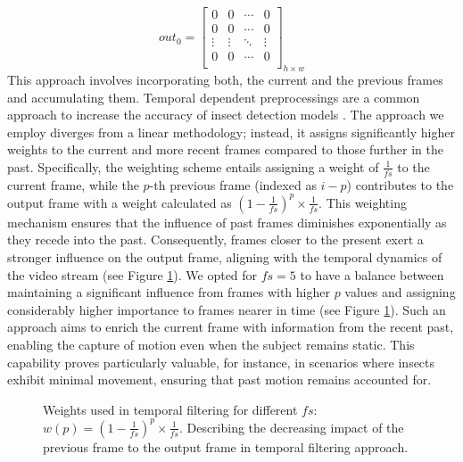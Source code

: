 \documentclass[sigchi,screen]{acmart}
\begin{document}
\[
out_0 = \begin{bmatrix}
0 & 0 & \cdots & 0 \\
0 & 0 & \cdots & 0 \\
\vdots & \vdots & \ddots & \vdots \\
0 & 0 & \cdots & 0 \\
\end{bmatrix}_{h \times w}
\]
This approach involves incorporating both, the current and the previous frames and accumulating them. Temporal dependent preprocessings are a common approach to increase the accuracy of insect detection models \cite{thiele2021towards}. The approach we employ diverges from a linear methodology; instead, it assigns significantly higher weights to the current and more recent frames compared to those further in the past. Specifically, the weighting scheme entails assigning a weight of $\frac{1}{fs}$ to the current frame, while the $p$-th previous frame (indexed as $i-p$) contributes to the output frame with a weight calculated as ${\left(1-\frac{1}{fs}\right)}^p \times \frac{1}{fs}$. This weighting mechanism ensures that the influence of past frames diminishes exponentially as they recede into the past. Consequently, frames closer to the present exert a stronger influence on the output frame, aligning with the temporal dynamics of the video stream (see Figure \ref{fig:tf}). We opted for $fs = 5$ to have a balance between maintaining a significant influence from frames with higher $p$ values and assigning considerably higher importance to frames nearer in time (see Figure \ref{fig:tf}). Such an approach aims to enrich the current frame with information from the recent past, enabling the capture of motion even when the subject remains static. This capability proves particularly valuable, for instance, in scenarios where insects exhibit minimal movement, ensuring that past motion remains accounted for.

\begin{figure}[H]
\caption{Weights used in temporal filtering for different $fs$: $w(p) = {\left(1-\frac{1}{fs}\right)}^p \times \frac{1}{fs}$. Describing the decreasing impact of the previous frame to the output frame in temporal filtering approach.}
\label{fig:tf}
\end{figure}
\end{document}
